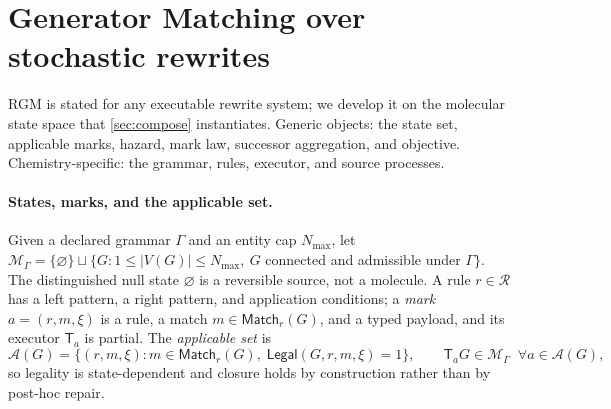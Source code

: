 \documentclass{article}
\newcommand{\rgm}{\textsc{RGM}\xspace}
\newcommand{\M}{\mathcal{M}_{\Gamma}}
\newcommand{\Rset}{\mathcal{R}}
\newcommand{\A}{\mathcal{A}}
\newcommand{\T}{\mathsf{T}}
\newcommand{\legal}{\mathsf{Legal}}
\newcommand{\Match}{\mathsf{Match}}
\theoremstyle{definition}
\theoremstyle{remark}
\begin{document}
\section{Generator Matching over stochastic rewrites}
\label{sec:rgm}

\rgm is stated for any executable rewrite system; we develop it on the molecular state space that \cref{sec:compose} instantiates. Generic objects: the state set, applicable marks, hazard, mark law, successor aggregation, and objective. Chemistry-specific: the grammar, rules, executor, and source processes.

\paragraph{States, marks, and the applicable set.}
Given a declared grammar $\Gamma$ and an entity cap $N_{\max}$, let $\M=\{\varnothing\}\sqcup\{G:1\le|V(G)|\le N_{\max},\ G$ connected and admissible under $\Gamma\}$. The distinguished null state $\varnothing$ is a reversible source, not a molecule. A rule $r\in\Rset$ has a left pattern, a right pattern, and application conditions; a \emph{mark} $a=(r,m,\xi)$ is a rule, a match $m\in\Match_r(G)$, and a typed payload, and its executor $\T_a$ is partial. The \emph{applicable set} is
\begin{equation}
\A(G)=\{(r,m,\xi):m\in\Match_r(G),\;\legal(G,r,m,\xi)=1\},
\qquad \T_aG\in\M\;\;\forall a\in\A(G),
\label{eq:legal-fiber}
\end{equation}
so legality is state-dependent and closure holds by construction rather than by post-hoc repair.
\end{document}
